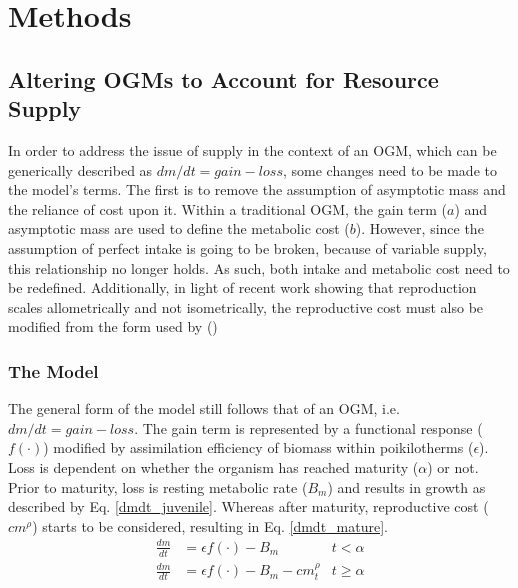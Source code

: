 \documentclass[a4paper, 11pt, hidelinks]{article} %
\begin{document}
	
\section{Methods}
	
	\subsection{Altering OGMs to Account for Resource Supply}
	In order to address the issue of supply in the context of an OGM, which can be generically described as $dm/dt = gain - loss$, some changes need to be made to the model's terms.  The first is to remove the assumption of asymptotic mass and the reliance of cost upon it.  Within a traditional OGM, the gain term ($ a $) and asymptotic mass are used to define the metabolic cost ($ b $).  However, since the assumption of perfect intake is going to be broken, because of variable supply, this relationship no longer holds.  As such, both intake and metabolic cost need to be redefined.  Additionally, in light of recent work showing that reproduction scales allometrically and not isometrically, the reproductive cost must also be modified from the form used by \citeauthor{Charnov2001} (\citeyear{Charnov2001}) \parencite{Marshall2019, Barneche2018} 
	
	\subsubsection{The Model}
	The general form of the model still follows that of an OGM, i.e. $dm/dt = gain - loss$.  The gain term is represented by a functional response ($ f(\cdot)$) modified by assimilation efficiency of biomass within poikilotherms ($ \epsilon $).  Loss is dependent on whether the organism has reached maturity ($ \alpha $) or not.  Prior to maturity, loss is resting metabolic rate ($ B_m $) and results in growth as described by Eq. \ref{dmdt_juvenile}.  Whereas after maturity, reproductive cost ($ cm^\rho $) starts to be considered, resulting in Eq. \ref{dmdt_mature}.
	\begin{align}
		\label{dmdt_juvenile}
		\frac{dm}{dt} &= \epsilon f(\cdot) - B_m & t < \alpha \\
		\label{dmdt_mature}
		\frac{dm}{dt} &= \epsilon f(\cdot) - B_m - cm_t^\rho & t \geq \alpha
	\end{align}
	
	
\end{document}
